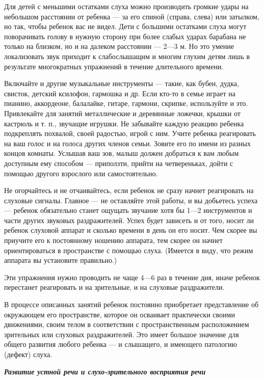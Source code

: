 \documentclass{book}
\renewcommand{\emph}[1]{\textit{#1}}
\begin{document}
Для детей с меньшими остатками слуха можно производить громкие удары на
небольшом расстоянии от ребенка --- за его спиной (справа, слева) или
затылком, но так, чтобы ребенок вас не видел. Дети с большими остатками
слуха могут поворачивать голову в нужную сторону при более слабых ударах
барабана не только на близком, но и на далеком расстоянии --- 2---3 м.
Но это умение локализовать звук приходит к слабослышащим и многим глухим
детям лишь в результате многократных упражнений в течение длительного
времени.

Включайте и другие музыкальные инструменты --- такие, как бубен, дудка,
свисток, детский ксилофон, гармошка и др. Если кто-то в семье играет на
пианино, аккордеоне, балалайке, гитаре, гармони, скрипке, используйте и
это. Привлекайте для занятий металлические и деревянные ложечки, крышки
от кастрюль и т. п., звучащие игрушки. Не забывайте каждую реакцию
ребенка подкреплять похвалой, своей радостью, игрой с ним. Учите ребенка
реагировать на ваш голос и на голоса других членов семьи. Зовите его по
имени из разных концов комнаты. Услышав ваш зов, малыш должен добраться
к вам любым доступным ему способом --- приползти, прийти на
четвереньках, дойти с помощью другого взрослого или самостоятельно.

Не огорчайтесь и не отчаивайтесь, если ребенок не сразу начнет
реагировать на слуховые сигналы. Главное --- не оставляйте этой работы,
и вы добьетесь успеха --- ребенок обязательно станет ощущать звучание
хотя бы 1---2 инструментов и части других звуковых раздражителей. Успех
будет зависеть и от того, носит ли ребенок слуховой аппарат и сколько
времени в день он его носит. Чем скорее вы приучите его к постоянному
ношению аппарата, тем скорее он начнет ориентироваться в пространстве с
помощью слуха. (Имеется в виду, что режим аппарата вы установите
правильно.)

Эти упражнения нужно проводить не чаще 4---6 раз в течение дня, иначе
ребенок перестанет реагировать и на зрительные, и на слуховые
раздражители.

В процессе описанных занятий ребенок постоянно приобретает представление
об окружающем его пространстве, которое он осваивает практически своими
движениями, своим телом в соответствии с пространственным расположением
зрительных или слуховых раздражителей. Это имеет большое значение для
общего развития любого ребенка --- и слышащего, и имеющего патологию
(дефект) слуха.

\emph{\textbf{Развитие устной речи и слухо-зрительного восприятия речи}}
\end{document}
